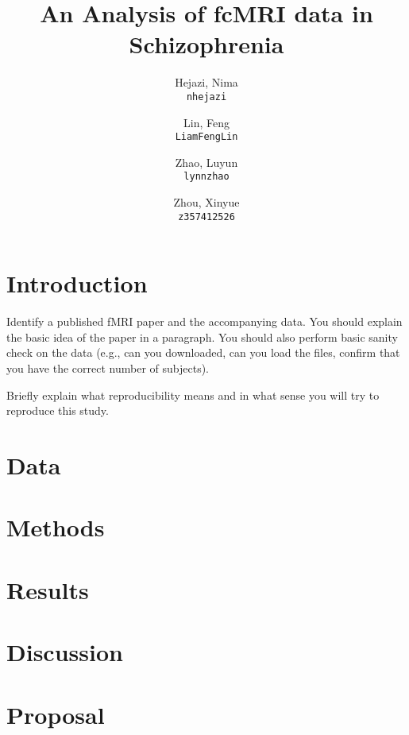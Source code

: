 \documentclass[11pt]{article}
\title{An Analysis of fcMRI data in Schizophrenia}
\author{
  Hejazi, Nima\\
  \texttt{nhejazi}
  \and
  Lin, Feng\\
  \texttt{LiamFengLin}
  \and
 Zhao, Luyun\\
  \texttt{lynnzhao}
  \and
  Zhou, Xinyue\\
  \texttt{z357412526}
}
\begin{document}
\maketitle


\section{Introduction}

Identify a published fMRI paper and the accompanying data. You should explain 
the basic idea of the paper in a paragraph. You should also perform basic sanity 
check on the data (e.g., can you downloaded, can you load the files, confirm 
that you have the correct number of subjects).

Briefly explain what reproducibility means and in what sense you will
try to reproduce this study.

\section{Data}



\section{Methods}



\section{Results}



\section{Discussion}



\section{Proposal}
\end{document}
